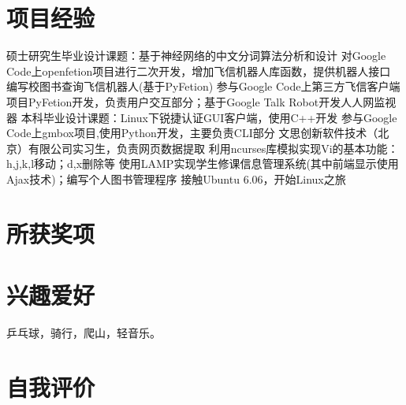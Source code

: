 \documentclass[a4paper]{moderncv}
\begin{document}
\begin{CJK*}{UTF8}{gbsn}
\section{项目经验}
{ 硕士研究生毕业设计课题：基于神经网络的中文分词算法分析和设计 }
{ 对Google Code上openfetion项目进行二次开发，增加飞信机器人库函数，提供机器人接口 }
{ 编写校图书查询飞信机器人(基于PyFetion)}
{ 参与Google Code上第三方飞信客户端项目PyFetion开发，负责用户交互部分；基于Google Talk Robot开发人人网监视器}
{ 本科毕业设计课题：Linux下锐捷认证GUI客户端，使用C++开发 }
{ 参与Google Code上gmbox项目,使用Python开发，主要负责CLI部分 }
{ 文思创新软件技术（北京）有限公司实习生，负责网页数据提取 }
{ 利用ncurses库模拟实现Vi的基本功能：h,j,k,l移动；d,x删除等 }
{ 使用LAMP实现学生修课信息管理系统(其中前端显示使用Ajax技术)；编写个人图书管理程序 }
{ 接触Ubuntu 6.06，开始Linux之旅}

\section{所获奖项}

\section{兴趣爱好}
\cvitem{}
{
\small 乒乓球，骑行，爬山，轻音乐。
}
\section{自我评价}

\closesection
\end{CJK*}
\end{document}
